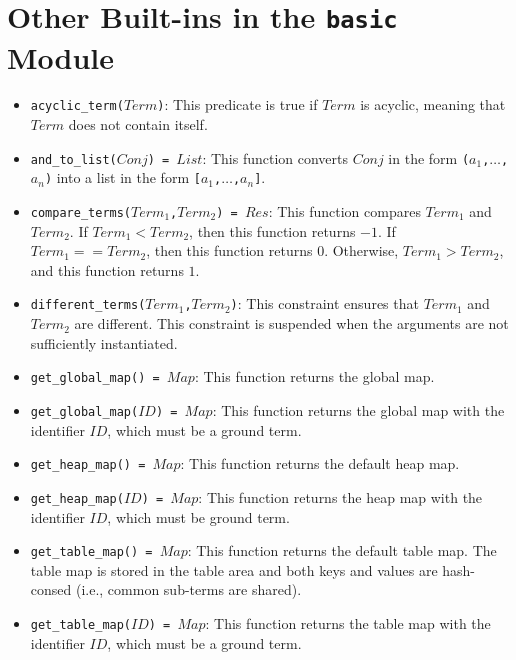 \section{\label{sec:otherbuiltins}Other Built-ins in the \texttt{basic} Module}
\begin{itemize}
\item \texttt{acyclic\_term($Term$)}: This predicate is true if $Term$ is acyclic, meaning that $Term$ does not contain itself.
\item \texttt{and\_to\_list($Conj$) = $List$}: This function converts $Conj$ in the form \texttt{($a_1$,$\ldots$,$a_n$)} into a list in the form \texttt{[$a_1$,$\ldots$,$a_n$]}.
\item \texttt{compare\_terms($Term_1$,$Term_2$) = $Res$}:  This function compares $Term_1$ and $Term_2$.  If $Term_1 < Term_2$, then this function returns $-1$.  If $Term_1 == Term_2$, then this function returns $0$.  Otherwise, $Term_1 > Term_2$, and this function returns $1$.
\item \texttt{different\_terms($Term_1$,$Term_2$)}: This constraint ensures that $Term_1$ and $Term_2$ are different. This constraint is suspended when the arguments are not sufficiently instantiated.
\item \texttt{get\_global\_map() = $Map$}: This function returns the global map.
\item \texttt{get\_global\_map($ID$) = $Map$}: This function returns the global map with the identifier $ID$, which must be a ground term.
\item \texttt{get\_heap\_map() = $Map$}: This function returns the default heap map.
\item \texttt{get\_heap\_map($ID$) = $Map$}: This function returns the heap map with the identifier $ID$, which must be ground term.  
\item \texttt{get\_table\_map() = $Map$}: This function returns the default table map. The table map is stored in the table area and both keys and values are hash-consed (i.e., common sub-terms are shared).
\item \texttt{get\_table\_map($ID$) = $Map$}: This function returns the table map with the identifier $ID$, which must be a ground term. 

\end{itemize}
